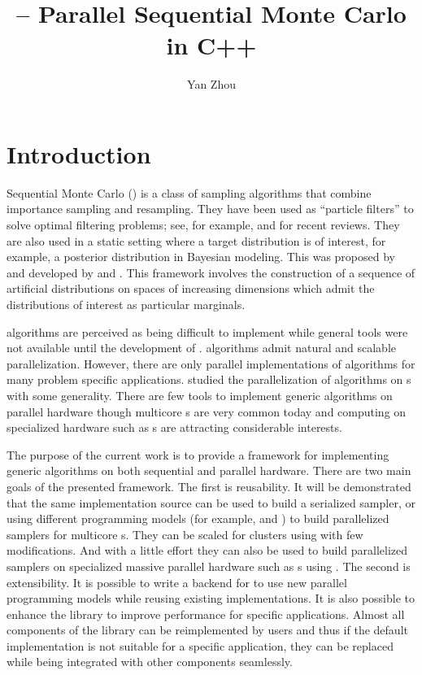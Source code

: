 \documentclass[11pt, fontset=Minion, showoverfull,
bib, mintcode, minted=cache]{marticle}
\title{\protect\vsmc{} -- Parallel Sequential Monte Carlo in C++}
\author{Yan Zhou}
\begin{document}
\maketitle

\section{Introduction}
\label{sec:Introduction}

Sequential Monte Carlo (\smc) is a class of sampling algorithms that combine
importance sampling and resampling. They have been used as ``particle
filters'' to solve optimal filtering problems; see, for example,
\textcite{Cappe:2007hz} and \textcite{Doucet:2011us} for recent reviews. They
are also used in a static setting where a target distribution is of interest,
for example, a posterior distribution in Bayesian modeling. This was proposed
by \textcite{DelMoral:2006hc} and developed by \textcite{Peters:2005wh} and
\textcite{DelMoral:2006wv}. This framework involves the construction of a
sequence of artificial distributions on spaces of increasing dimensions which
admit the distributions of interest as particular marginals.

\Smc algorithms are perceived as being difficult to implement while general
tools were not available until the development of \fsmctc \parencite{smctc}.
\Smc algorithms admit natural and scalable parallelization. However, there are
only parallel implementations of \smc algorithms for many problem specific
applications. \textcite{Lee:2010fm} studied the parallelization of \smc
algorithms on \gpu{}s with some generality. There are few tools to implement
generic \smc algorithms on parallel hardware though multicore \cpu{}s are very
common today and computing on specialized hardware such as \gpu{}s are
attracting considerable interests.

The purpose of the current work is to provide a framework for implementing
generic \smc algorithms on both sequential and parallel hardware. There are
two main goals of the presented framework. The first is reusability. It will
be demonstrated that the same implementation source can be used to build a
serialized sampler, or using different programming models (for example,
\fopenmp and \ftbb) to build parallelized samplers for multicore \cpu{}s. They
can be scaled for clusters using \fmpi with few modifications. And with a
little effort they can also be used to build parallelized samplers on
specialized massive parallel hardware such as \gpu{}s using \fopencl. The
second is extensibility. It is possible to write a backend for \vsmc to use
new parallel programming models while reusing existing implementations. It is
also possible to enhance the library to improve performance for specific
applications. Almost all components of the library can be reimplemented by
users and thus if the default implementation is not suitable for a specific
application, they can be replaced while being integrated with other components
seamlessly.
\end{document}

